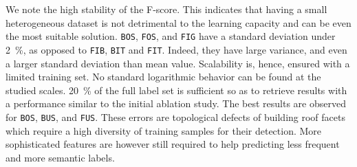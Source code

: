         \begin{figure}[htbp]
        \end{figure}
            
        We note the high stability of the F-score.
        This indicates that having a small heterogeneous dataset is not detrimental to the learning capacity and can be even the most suitable solution.
        \texttt{BOS}, \texttt{FOS}, and \texttt{FIG} have a standard deviation under \SI{2}{\percent}, as opposed to \texttt{FIB}, \texttt{BIT} and \texttt{FIT}.
        Indeed, they have large variance, and even a larger standard deviation than mean value.
        Scalability is, hence, ensured with a limited training set.
        No standard logarithmic behavior can be found at the studied scales.
        \SI{20}{\percent} of the full label set is sufficient so as to retrieve results with a performance similar to the initial ablation study.
        The best results are observed for \texttt{BOS}, \texttt{BUS}, and \texttt{FUS}.
        These errors are topological defects of building roof facets which require a high diversity of training samples for their detection.
        More sophisticated features are however still required to help predicting less frequent and more semantic labels.
    
